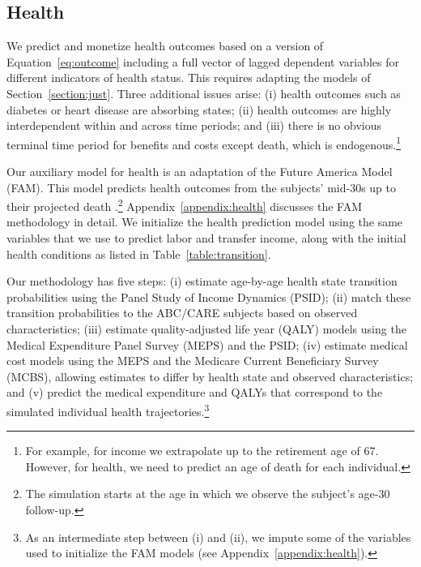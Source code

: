 \subsection{Health} \label{section:health}

We predict and monetize health outcomes based on a version of Equation~\eqref{eq:outcome} including a full vector of lagged dependent variables for different indicators of health status. This requires adapting the models of Section~\ref{section:just}. Three additional issues arise: (i) health outcomes such as diabetes or heart disease are absorbing states; (ii) health outcomes are highly interdependent within and across time periods; and (iii) there is no obvious terminal time period for benefits and costs except death, which is endogenous.\footnote{For example, for income we extrapolate up to the retirement age of 67. However, for health, we need to predict an age of death for each individual.}

Our auxiliary model for health is an adaptation of the Future America Model (FAM). This model predicts health outcomes from the subjects' mid-30s up to their projected death \citep{Goldman_etal_2015_Future-Elderly-Model-Report}.\footnote{The simulation starts at the age in which we observe the subject's age-30 follow-up.} Appendix~\ref{appendix:health} discusses the FAM methodology in detail. We initialize the health prediction model using the same variables that we use to predict labor and transfer income, along with the initial health conditions as listed in Table~\ref{table:transition}.

Our methodology has five steps: (i) estimate age-by-age health state transition probabilities using the Panel Study of Income Dynamics (PSID); (ii) match these transition probabilities to the ABC/CARE subjects based on observed characteristics; (iii) estimate quality-adjusted life year (QALY) models using the Medical Expenditure Panel Survey (MEPS) and the PSID; (iv) estimate medical cost models using the MEPS and the Medicare Current Beneficiary Survey (MCBS), allowing estimates to differ by health state and observed characteristics; and (v) predict the medical expenditure and QALYs that correspond to the simulated individual health trajectories.\footnote{As an intermediate step between (i) and (ii), we impute some of the variables used to initialize the FAM models (see Appendix~\ref{appendix:health}).}

